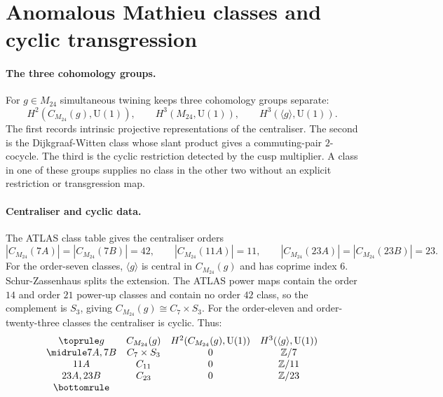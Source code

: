 
\providecommand{\CM}{C_{M_{24}}}
\providecommand{\Z}{\mathbb{Z}}
\providecommand{\U}{\mathrm{U}\!\left(1\right)}
\providecommand{\res}{\operatorname{res}}
\providecommand{\Sym}{\operatorname{Sym}}

\section*{Anomalous Mathieu classes and cyclic transgression}

\paragraph{The three cohomology groups.}
For \(g\in M_{24}\) simultaneous twining keeps three cohomology groups
separate:
\[
H^2(\CM(g),\U),\qquad
H^3(M_{24},\U),\qquad
H^3(\langle g\rangle,\U).
\]
The first records intrinsic projective representations of the
centraliser.  The second is the Dijkgraaf-Witten class whose slant product
gives a commuting-pair \(2\)-cocycle.  The third is the cyclic restriction
detected by the cusp multiplier.  A class in one of these groups supplies
no class in the other two without an explicit restriction or transgression
map.

\paragraph{Centraliser and cyclic data.}
The ATLAS class table gives the centraliser orders
\[
|\CM(7A)|=|\CM(7B)|=42,\qquad
|\CM(11A)|=11,\qquad
|\CM(23A)|=|\CM(23B)|=23.
\]
For the order-seven classes, \(\langle g\rangle\) is central in
\(\CM(g)\) and has coprime index \(6\).  Schur-Zassenhaus splits the
extension.  The ATLAS power maps contain the order \(14\) and order \(21\)
power-up classes and contain no order \(42\) class, so the complement is
\(S_3\), giving \(\CM(g)\cong C_7\times S_3\).  For the order-eleven and
order-twenty-three classes the centraliser is cyclic.  Thus:
\[
\begin{array}{cccc}
\toprule
g & \CM(g) & H^2(\CM(g),\U) & H^3(\langle g\rangle,\U) \\
\midrule
7A,7B & C_7\times S_3 & 0 & \Z/7 \\
11A & C_{11} & 0 & \Z/11 \\
23A,23B & C_{23} & 0 & \Z/23 \\
\bottomrule
\end{array}
\]

